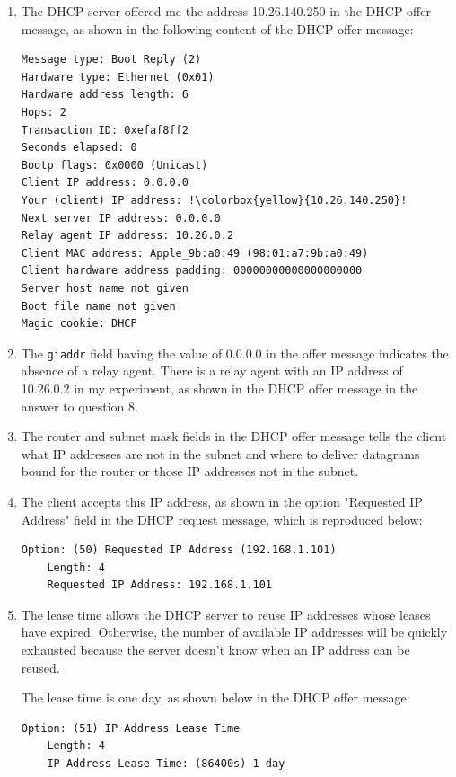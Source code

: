 \documentclass{article}
\begin{document}
\begin{enumerate}
    \item The DHCP server offered me the address 10.26.140.250 in the DHCP offer message, as shown in the following content of the DHCP offer message:
\begin{verbatim}
Message type: Boot Reply (2)
Hardware type: Ethernet (0x01)
Hardware address length: 6
Hops: 2
Transaction ID: 0xefaf8ff2
Seconds elapsed: 0
Bootp flags: 0x0000 (Unicast)
Client IP address: 0.0.0.0
Your (client) IP address: !\colorbox{yellow}{10.26.140.250}!
Next server IP address: 0.0.0.0
Relay agent IP address: 10.26.0.2
Client MAC address: Apple_9b:a0:49 (98:01:a7:9b:a0:49)
Client hardware address padding: 00000000000000000000
Server host name not given
Boot file name not given
Magic cookie: DHCP
\end{verbatim}

    \item The \texttt{giaddr} field having the value of 0.0.0.0 in the offer message indicates the absence of a relay agent. There is a relay agent with an IP address of 10.26.0.2 in my experiment, as shown in the DHCP offer message in the answer to question 8.

    \item The router and subnet mask fields in the DHCP offer message tells the client what IP addresses are not in the subnet and where to deliver datagrams bound for the router or those IP addresses not in the subnet.

    \item The client accepts this IP address, as shown in the option "Requested IP Address" field in the DHCP request message, which is reproduced below:
\begin{verbatim}
Option: (50) Requested IP Address (192.168.1.101)
    Length: 4
    Requested IP Address: 192.168.1.101
\end{verbatim}

    \item The lease time allows the DHCP server to reuse IP addresses whose leases have expired. Otherwise, the number of available IP addresses will be quickly exhausted because the server doesn't know when an IP address can be reused.
    
    The lease time is one day, as shown below in the DHCP offer message:
\begin{verbatim}
Option: (51) IP Address Lease Time
    Length: 4
    IP Address Lease Time: (86400s) 1 day
\end{verbatim}


\end{enumerate}
\end{document}
